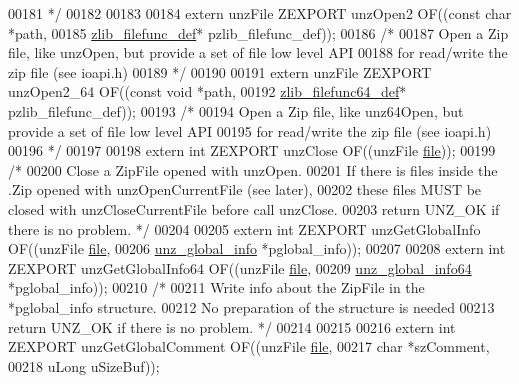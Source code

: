 \begin{DoxyCode}
00181 \textcolor{comment}{*/}
00182 
00183 
00184 \textcolor{keyword}{extern} unzFile ZEXPORT unzOpen2 OF((\textcolor{keyword}{const} \textcolor{keywordtype}{char} *path,
00185                                     \hyperlink{structzlib__filefunc__def__s}{zlib\_filefunc\_def}* pzlib\_filefunc\_def));
00186 \textcolor{comment}{/*}
00187 \textcolor{comment}{   Open a Zip file, like unzOpen, but provide a set of file low level API}
00188 \textcolor{comment}{      for read/write the zip file (see ioapi.h)}
00189 \textcolor{comment}{*/}
00190 
00191 \textcolor{keyword}{extern} unzFile ZEXPORT unzOpen2\_64 OF((\textcolor{keyword}{const} \textcolor{keywordtype}{void} *path,
00192                                     \hyperlink{structzlib__filefunc64__def__s}{zlib\_filefunc64\_def}* pzlib\_filefunc\_def));
00193 \textcolor{comment}{/*}
00194 \textcolor{comment}{   Open a Zip file, like unz64Open, but provide a set of file low level API}
00195 \textcolor{comment}{      for read/write the zip file (see ioapi.h)}
00196 \textcolor{comment}{*/}
00197 
00198 \textcolor{keyword}{extern} \textcolor{keywordtype}{int} ZEXPORT unzClose OF((unzFile \hyperlink{structfile}{file}));
00199 \textcolor{comment}{/*}
00200 \textcolor{comment}{  Close a ZipFile opened with unzOpen.}
00201 \textcolor{comment}{  If there is files inside the .Zip opened with unzOpenCurrentFile (see later),}
00202 \textcolor{comment}{    these files MUST be closed with unzCloseCurrentFile before call unzClose.}
00203 \textcolor{comment}{  return UNZ\_OK if there is no problem. */}
00204 
00205 \textcolor{keyword}{extern} \textcolor{keywordtype}{int} ZEXPORT unzGetGlobalInfo OF((unzFile \hyperlink{structfile}{file},
00206                                         \hyperlink{structunz__global__info__s}{unz\_global\_info} *pglobal\_info));
00207 
00208 \textcolor{keyword}{extern} \textcolor{keywordtype}{int} ZEXPORT unzGetGlobalInfo64 OF((unzFile \hyperlink{structfile}{file},
00209                                         \hyperlink{structunz__global__info64__s}{unz\_global\_info64} *pglobal\_info));
00210 \textcolor{comment}{/*}
00211 \textcolor{comment}{  Write info about the ZipFile in the *pglobal\_info structure.}
00212 \textcolor{comment}{  No preparation of the structure is needed}
00213 \textcolor{comment}{  return UNZ\_OK if there is no problem. */}
00214 
00215 
00216 \textcolor{keyword}{extern} \textcolor{keywordtype}{int} ZEXPORT unzGetGlobalComment OF((unzFile \hyperlink{structfile}{file},
00217                                            \textcolor{keywordtype}{char} *szComment,
00218                                            uLong uSizeBuf));

\end{DoxyCode}
